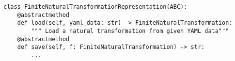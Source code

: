 \begin{verbatim}
class FiniteNaturalTransformationRepresentation(ABC):
    @abstractmethod
    def load(self, yaml_data: str) -> FiniteNaturalTransformation:
        """ Load a natural transformation from given YAML data"""
    @abstractmethod
    def save(self, f: FiniteNaturalTransformation) -> str:
        ...
\end{verbatim}